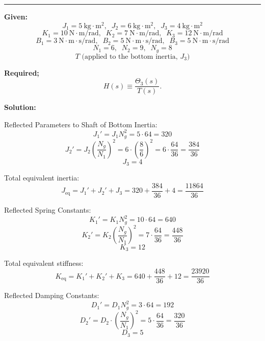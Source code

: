 \begin{figure}[!ht]
{
}%
\end{figure}

\noindent\rule{\textwidth}{1pt}
\textbf{Given:}
\[
J_1 = 5~\mathrm{kg\cdot m^2},\;\; J_2 = 6~\mathrm{kg\cdot m^2},\;\; J_3 = 4~\mathrm{kg\cdot m^2}
\]
\[
K_1 = 10~\mathrm{N\cdot m/rad},\;\; K_2 = 7~\mathrm{N\cdot m/rad},\;\; K_3 = 12~\mathrm{N\cdot m/rad}
\]
\[
B_1 = 3~\mathrm{N\cdot m\cdot s/rad},\;\; B_2 = 5~\mathrm{N\cdot m\cdot s/rad},\;\; B_3 = 5~\mathrm{N\cdot m\cdot s/rad}
\]
\[
N_1 = 6,\;\; N_2 = 9,\;\; N_g = 8
\]
\[
T \text{ (applied to the bottom inertia, } J_3\text{)}
\]

\vspace{4pt}
\textbf{Required;}
\[
H(s) \equiv \frac{\Theta_3(s)}{T(s)}.
\]

\textbf{Solution:}

Reflected Parameters to Shaft of Bottom Inertia:
\[
J_1' = J_1 N_g^2 = 5 \cdot 64 = 320
\]
\[
J_2' = J_2 \left( \frac{N_g}{N_1} \right)^2 = 6 \cdot \left( \frac{8}{6} \right)^2 = 6 \cdot \frac{64}{36} = \frac{384}{36}
\]
\[
J_3 = 4
\]

Total equivalent inertia:
\[
J_{\text{eq}} = J_1' + J_2' + J_3 = 320 + \frac{384}{36} + 4 = \frac{11864}{36}
\]

Reflected Spring Constants:
\[
K_1' = K_1 N_g^2 = 10 \cdot 64 = 640
\]
\[
K_2' = K_2 \left( \frac{N_g}{N_1} \right)^2 = 7 \cdot \frac{64}{36} = \frac{448}{36}
\]
\[
K_3 = 12
\]

Total equivalent stiffness:
\[
K_{\text{eq}} = K_1' + K_2' + K_3 = 640 + \frac{448}{36} + 12 = \frac{23920}{36}
\]

Reflected Damping Constants:
\[
D_1' = D_1 N_g^2 = 3 \cdot 64 = 192
\]
\[
D_2' = D_2 \cdot \left( \frac{N_g}{N_1} \right)^2 = 5 \cdot \frac{64}{36} = \frac{320}{36}
\]
\[
D_3 = 5
\]

